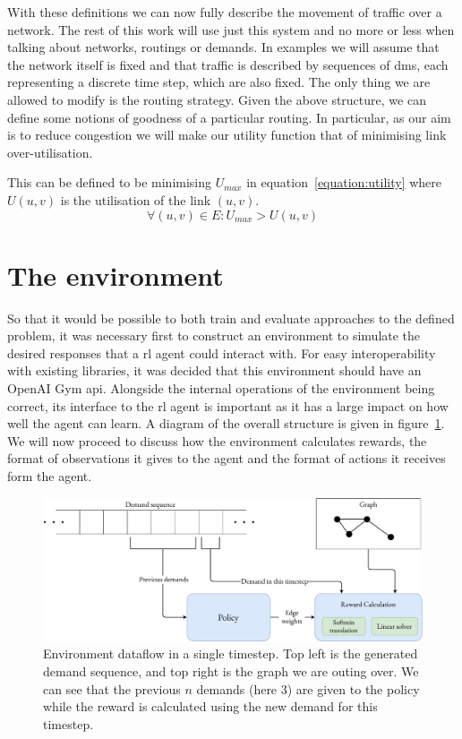 With these definitions we can now fully describe the movement of traffic over a network. The rest of this work will use just this system and no more or less when talking about networks, routings or demands. In examples we will assume that the network itself is fixed and that traffic is described by sequences of \acp{dm}, each representing a discrete time step, which are also fixed. The only thing we are allowed to modify is the routing strategy. Given the above structure, we can define some notions of goodness of a particular routing. In particular, as our aim is to reduce congestion we will make our utility function that of minimising link over-utilisation.

This can be defined to be minimising $U_{max}$ in equation~\ref{equation:utility} where $U(u,v)$ is the utilisation of the link $(u,v)$.
\begin{equation}
  \label{equation:utility}
  \forall (u,v) \in E: U_{max} > U(u,v)
\end{equation}


\section{The environment}
So that it would be possible to both train and evaluate approaches to the defined problem, it was necessary first to construct an environment to simulate the desired responses that a \ac{rl} agent could interact with. For easy interoperability with existing libraries, it was decided that this environment should have an OpenAI Gym\cite{brockman2016openai} \acs{api}. Alongside the internal operations of the environment being correct, its interface to the \ac{rl} agent is important as it has a large impact on how well the agent can learn. A diagram of the overall structure is given in figure~\ref{fig:environment}. We will now proceed to discuss how the environment calculates rewards, the format of observations it gives to the agent and the format of actions it receives form the agent.

\begin{figure}
  \centering
  \includegraphics[width=\textwidth]{figures/environment.pdf}
  \caption{Environment dataflow in a single timestep. Top left is the generated demand sequence, and top right is the graph we are outing over. We can see that the previous $n$ demands (here 3) are given to the policy while the reward is calculated using the new demand for this timestep.}
  \label{fig:environment}
\end{figure}

